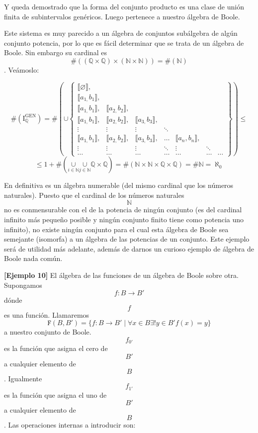 \begin{enumerate}
  Y queda demostrado que la forma del conjunto producto es una clase de
  unión finita de subintervalos genéricos. Luego pertenece a nuestro
  álgebra de Boole.

  Este sistema es muy parecido a un álgebra de conjuntos subálgebra de
  algún conjunto po\-tencia, por lo que es fácil determinar que se trata
  de un álgebra de Boole. Sin embargo su cardinal es
  \[\#{\left( {\left( {\mathbb{Q} \times \mathbb{Q}} \right) \times \left( {\mathbb{N} \times \mathbb{N}} \right)} \right) = \#}\left( \mathbb{N} \right)\].
  Veámoslo:

  \[{{\#\left( \mathbf{\mathrm{I}}_{\mathbb{Q}}^{\mathbf{\mathrm{GEN}}} \right)} = {\#\left( {\mathbf{\mathrm{\cup}}\begin{Bmatrix}
  {{⟦\varnothing ⟧},} & & & & & & \\
  {{⟦{a_{1,}b_{1}}⟧},} & & & & & & \\
  {{⟦{a_{1,}b_{1}}⟧},} & {{⟦{a_{2,}b_{2}}⟧},} & & & & & \\
  {{⟦{a_{1,}b_{1}}⟧},} & {{⟦{a_{2,}b_{2}}⟧},} & {{⟦{a_{3,}b_{3}}⟧},} & & & & \\
   \vdots & \vdots & \vdots & \ddots & & & \\
  {{⟦{a_{1,}b_{1}}⟧},} & {{⟦{a_{2,}b_{2}}⟧},} & {{⟦{a_{3,}b_{3}}⟧},} & \ldots & {{⟦{a_{n},b_{n}}⟧},} & & \\
   \vdots & \vdots & \vdots & \ddots & \vdots & \ddots & \\
  \ldots & \ldots & \ldots & \ldots & \ldots & \ldots & \ldots
  \end{Bmatrix}} \right)}} \leq\]\[{{\leq {1 + {\#\left( {\underset{i \in \mathbb{N}}{\mathbf{\mathrm{\cup}}}\underset{j \in \mathbb{N}}{\mathbf{\mathrm{\cup}}}{\mathbb{Q} \times \mathbb{Q}}} \right)}}} = \#}{\left( {{{\mathbb{N} \times \mathbb{N}} \times \mathbb{Q}} \times \mathbb{Q}} \right) = \#}{\mathbb{N} = \aleph_{0}}\]

  En definitiva es un álgebra numerable (del mismo cardinal que los
  números naturales). Puesto que el cardinal de los números naturales
  \[\mathbb{N}\]no es conmensurable con el de la potencia de ningún
  conjunto (es del cardinal infinito más pequeño posible y ningún
  conjunto finito tiene como potencia uno infinito), no existe ningún
  conjunto para el cual esta álgebra de Boole sea semejante (isomorfa) a
  un álgebra de las potencias de un conjunto. Este ejemplo será de
  utilidad más adelante, además de darnos un curioso ejemplo de álgebra
  de Boole nada común.

  \textbf{{[}Ejemplo 10{]}} El álgebra de las funciones de un álgebra de
  Boole sobre otra. Supongamos \[f:{B\rightarrow B}'\]dónde \[f\] es una
  función. Llamaremos
  \[{\mathtt{F}{({B,B'})}} = {\{{f:{B\rightarrow B}' \mid \forall{x \in B}\exists!{y \in B}'f{{(x)} = y}}\}}\]
  a nuestro conjunto de Boole. \[f_{0'}\] es la función que asigna el
  cero de \[B'\] a cualquier elemento de \[B\]. Igualmente \[f_{1'}\] es
  la función que asigna el uno de \[B'\] a cualquier elemento de \[B\].
  Las operaciones internas a introducir son:


\end{enumerate}
